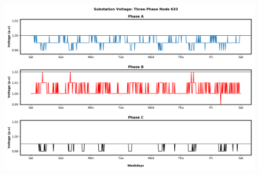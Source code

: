 \begin{figure}[H]
    \centering
    \includegraphics[width=1.1\columnwidth]{Pictures/hundred_three_phase_633_volt.png}
    \caption{}
\end{figure}

\newpage






